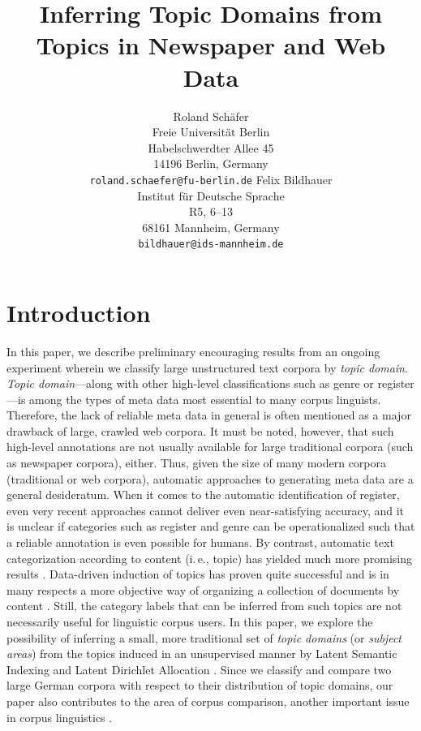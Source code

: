 \documentclass[11pt]{article}
\title{Inferring Topic Domains from Topics in Newspaper and Web Data}
\author{Roland Schäfer\\
	    Freie Universität Berlin\\
	    Habelschwerdter Allee 45\\
	    14196 Berlin, Germany\\
	    {\tt roland.schaefer@fu-berlin.de}
	  \And
	Felix Bildhauer\\
  	Institut für Deutsche Sprache\\
  	R5, 6--13\\
  	68161 Mannheim, Germany\\
  {\tt bildhauer@ids-mannheim.de}}
\date{}
\begin{document}
\maketitle

\begin{abstract}
\end{abstract}

\section{Introduction}
\label{sec:introduction}
In this paper, we describe preliminary encouraging results from an ongoing experiment wherein we classify large unstructured text corpora by \textit{topic domain}.
\textit{Topic domain}---along with other high-level classifications such as genre or register---is among the types of meta data most essential to many corpus linguists.
Therefore, the lack of reliable meta data in general is often mentioned as a major drawback of large, crawled web corpora.
It must be noted, however, that such high-level annotations are not usually available for large traditional corpora (such as newspaper corpora), either.
Thus, given the size of many modern corpora (traditional or web corpora), automatic approaches to generating meta data are a general desideratum.
When it comes to the automatic identification of register, even very recent approaches \cite{BiberEgbert2016} cannot deliver even near-satisfying accuracy, and it is unclear if categories such as register and genre can be operationalized such that a reliable annotation is even possible for humans.
By contrast, automatic text categorization according to content (i.\,e., topic) has yielded much more promising results \cite{Sebastiani2002}.
Data-driven induction of topics has proven quite successful and is in many respects a more objective way of organizing a collection of documents by content \cite{Eagles1996}.
Still, the category labels that can be inferred from such topics are not necessarily useful for linguistic corpus users.
In this paper, we explore the possibility of inferring a small, more traditional set of \textit{topic domains} (or \textit{subject areas}) from the topics induced in an unsupervised manner by Latent Semantic Indexing \cite{LandauerDumais1994,LandauerDumais1997,LSAHandbook} and Latent Dirichlet Allocation \cite{BleiEa2003}.
Since we classify and compare two large German corpora with respect to their distribution of topic domains, our paper also contributes to the area of corpus comparison, another important issue in corpus linguistics \cite{Kilgarriff2001,BiemannEa2013}.
\end{document}
